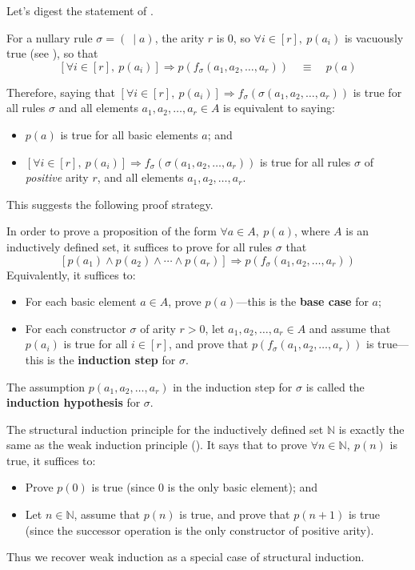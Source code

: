 Let's digest the statement of .

For a nullary rule $\sigma = (~ \mid a)$, the arity $r$ is $0$, so $\forall i \in [r],~p(a_i)$ is vacuously true (see ), so that
\[ [\forall i \in [r],~ p(a_i)] \Rightarrow p(f_{\sigma}(a_1,a_2,\dots,a_r)) \quad \equiv \quad p(a) \]

Therefore, saying that $[\forall i \in [r],~ p(a_i)] \Rightarrow f_{\sigma}(\sigma(a_1,a_2,\dots,a_r))$ is true for all rules $\sigma$ and all elements $a_1,a_2,\dots,a_r \in A$ is equivalent to saying:
\begin{itemize}
\item $p(a)$ is true for all basic elements $a$; and
\item $[\forall i \in [r],~ p(a_i)] \Rightarrow f_{\sigma}(\sigma(a_1,a_2,\dots,a_r))$ is true for all rules $\sigma$ of \textit{positive} arity $r$, and all elements $a_1,a_2,\dots,a_r$.
\end{itemize}

This suggests the following proof strategy.

\begin{strategy}
In order to prove a proposition of the form $\forall a \in A,~ p(a)$, where $A$ is an inductively defined set, it suffices to prove for all rules $\sigma$ that
\[ [p(a_1) \wedge p(a_2) \wedge \cdots \wedge p(a_r)] \Rightarrow p(f_{\sigma}(a_1,a_2,\dots,a_r)) \]
Equivalently, it suffices to:
\begin{itemize}
\item For each basic element $a \in A$, prove $p(a)$---this is the \textbf{base case} for $a$;
\item For each constructor $\sigma$ of arity $r>0$, let $a_1,a_2,\dots,a_r \in A$ and assume that $p(a_i)$ is true for all $i \in [r]$, and prove that $p(f_{\sigma}(a_1,a_2,\dots,a_r))$ is true---this is the \textbf{induction step} for $\sigma$.
\end{itemize}
The assumption $p(a_1,a_2,\dots,a_r)$ in the induction step for $\sigma$ is called the \textbf{induction hypothesis} for $\sigma$.
\end{strategy}

\begin{example}
The structural induction principle for the inductively defined set $\mathbb{N}$ is exactly the same as the weak induction principle (). It says that to prove $\forall n \in \mathbb{N},~ p(n)$ is true, it suffices to:
\begin{itemize}
\item Prove $p(0)$ is true (since $0$ is the only basic element); and
\item Let $n \in \mathbb{N}$, assume that $p(n)$ is true, and prove that $p(n+1)$ is true (since the successor operation is the only constructor of positive arity).
\end{itemize}
Thus we recover weak induction as a special case of structural induction.
\end{example}

